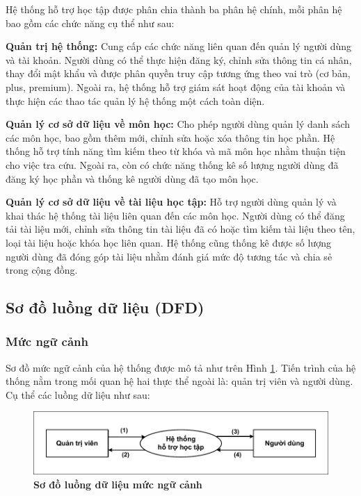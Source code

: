 \documentclass{article}
\begin{document}
	Hệ thống hỗ trợ học tập được phân chia thành ba phân hệ chính, mỗi phân hệ bao gồm các chức năng cụ thể như sau:
	
	\textbf{Quản trị hệ thống:} Cung cấp các chức năng liên quan đến quản lý người dùng và tài khoản. Người dùng có thể thực hiện đăng ký, chỉnh sửa thông tin cá nhân, thay đổi mật khẩu và được phân quyền truy cập tương ứng theo vai trò (cơ bản, plus, premium). Ngoài ra, hệ thống hỗ trợ giám sát hoạt động của tài khoản và thực hiện các thao tác quản lý hệ thống một cách toàn diện.
	
	\textbf{Quản lý cơ sở dữ liệu về môn học:} Cho phép người dùng quản lý danh sách các môn học, bao gồm thêm mới, chỉnh sửa hoặc xóa thông tin học phần. Hệ thống hỗ trợ tính năng tìm kiếm theo từ khóa và mã môn học nhằm thuận tiện cho việc tra cứu. Ngoài ra, còn có chức năng thống kê số lượng người dùng đã đăng ký học phần và thống kê người dùng đã tạo môn học.
	
	\textbf{Quản lý cơ sở dữ liệu về tài liệu học tập:} Hỗ trợ người dùng quản lý và khai thác hệ thống tài liệu liên quan đến các môn học. Người dùng có thể đăng tải tài liệu mới, chỉnh sửa thông tin tài liệu đã có hoặc tìm kiếm tài liệu theo tên, loại tài liệu hoặc khóa học liên quan. Hệ thống cũng thống kê được số lượng người dùng đã đóng góp tài liệu nhằm đánh giá mức độ tương tác và chia sẻ trong cộng đồng.
	
	\subsection{Sơ đồ luồng dữ liệu (DFD)}
	
	\subsubsection{Mức ngữ cảnh}
	
	Sơ đồ mức ngữ cảnh của hệ thống được mô tả như trên Hình \ref{fig32}. Tiến trình của hệ thống nằm trong mối quan hệ hai thực thể ngoài là: quản trị viên và người dùng. Cụ thể các luồng dữ liệu như sau:
	\begin{figure}[!ht]
		\centering
		\includegraphics[trim= 10pt 10pt 10pt 10pt, clip, width=15cm]{dfd_fig32.pdf}
		\caption [Sơ đồ luồng dữ liệu mức ngữ cảnh]{\bfseries \fontsize{12pt}{0pt}\selectfont Sơ đồ luồng dữ liệu mức ngữ cảnh}
		\label{fig32}
	\end{figure}
	
\end{document}
